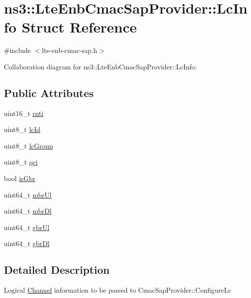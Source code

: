 \hypertarget{structns3_1_1LteEnbCmacSapProvider_1_1LcInfo}{}\section{ns3\+:\+:Lte\+Enb\+Cmac\+Sap\+Provider\+:\+:Lc\+Info Struct Reference}
\label{structns3_1_1LteEnbCmacSapProvider_1_1LcInfo}


{\ttfamily \#include $<$lte-\/enb-\/cmac-\/sap.\+h$>$}



Collaboration diagram for ns3\+:\+:Lte\+Enb\+Cmac\+Sap\+Provider\+:\+:Lc\+Info\+:
\subsection*{Public Attributes}
\begin{DoxyCompactItemize}
\item 
uint16\+\_\+t \hyperlink{structns3_1_1LteEnbCmacSapProvider_1_1LcInfo_a6f1d91aecf5d18a79929328856e8ab47}{rnti}
\item 
uint8\+\_\+t \hyperlink{structns3_1_1LteEnbCmacSapProvider_1_1LcInfo_a5fd3cd842409e94a98c903b4d56069f4}{lc\+Id}
\item 
uint8\+\_\+t \hyperlink{structns3_1_1LteEnbCmacSapProvider_1_1LcInfo_a3d9ae15a992e5f03d9fbabc600491dd6}{lc\+Group}
\item 
uint8\+\_\+t \hyperlink{structns3_1_1LteEnbCmacSapProvider_1_1LcInfo_a02e6137db57dec3c10c9c03f4df1b109}{qci}
\item 
bool \hyperlink{structns3_1_1LteEnbCmacSapProvider_1_1LcInfo_a6b5223044e8a2dfd723b0d4606c0f805}{is\+Gbr}
\item 
uint64\+\_\+t \hyperlink{structns3_1_1LteEnbCmacSapProvider_1_1LcInfo_a36321cf8d2546e0826b56ab69b0eee67}{mbr\+Ul}
\item 
uint64\+\_\+t \hyperlink{structns3_1_1LteEnbCmacSapProvider_1_1LcInfo_a06321acdb40866a5c02784d8afdb9aa9}{mbr\+Dl}
\item 
uint64\+\_\+t \hyperlink{structns3_1_1LteEnbCmacSapProvider_1_1LcInfo_a007b264804afa62008beca57b0297882}{gbr\+Ul}
\item 
uint64\+\_\+t \hyperlink{structns3_1_1LteEnbCmacSapProvider_1_1LcInfo_a5488a61f1e4c86b57259c2fe1d714744}{gbr\+Dl}
\end{DoxyCompactItemize}


\subsection{Detailed Description}
Logical \hyperlink{classns3_1_1Channel}{Channel} information to be passed to Cmac\+Sap\+Provider\+::\+Configure\+Lc 

